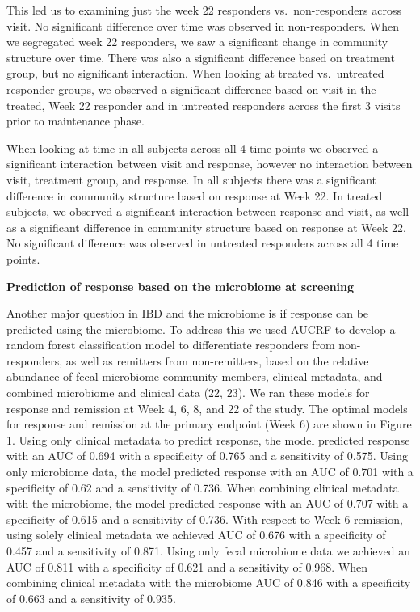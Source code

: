\documentclass[11pt,]{article}
\begin{document}
This led us to examining just the week 22 responders vs.~non-responders
across visit. No significant difference over time was observed in
non-responders. When we segregated week 22 responders, we saw a
significant change in community structure over time. There was also a
significant difference based on treatment group, but no significant
interaction. When looking at treated vs.~untreated responder groups, we
observed a significant difference based on visit in the treated, Week 22
responder and in untreated responders across the first 3 visits prior to
maintenance phase.

When looking at time in all subjects across all 4 time points we
observed a significant interaction between visit and response, however
no interaction between visit, treatment group, and response. In all
subjects there was a significant difference in community structure based
on response at Week 22. In treated subjects, we observed a significant
interaction between response and visit, as well as a significant
difference in community structure based on response at Week 22. No
significant difference was observed in untreated responders across all 4
time points.

\textbf{Prediction of response based on the microbiome at screening}

Another major question in IBD and the microbiome is if response can be
predicted using the microbiome. To address this we used AUCRF to develop
a random forest classification model to differentiate responders from
non-responders, as well as remitters from non-remitters, based on the
relative abundance of fecal microbiome community members, clinical
metadata, and combined microbiome and clinical data (22, 23). We ran
these models for response and remission at Week 4, 6, 8, and 22 of the
study. The optimal models for response and remission at the primary
endpoint (Week 6) are shown in Figure 1. Using only clinical metadata to
predict response, the model predicted response with an AUC of 0.694 with
a specificity of 0.765 and a sensitivity of 0.575. Using only microbiome
data, the model predicted response with an AUC of 0.701 with a
specificity of 0.62 and a sensitivity of 0.736. When combining clinical
metadata with the microbiome, the model predicted response with an AUC
of 0.707 with a specificity of 0.615 and a sensitivity of 0.736. With
respect to Week 6 remission, using solely clinical metadata we achieved
AUC of 0.676 with a specificity of 0.457 and a sensitivity of 0.871.
Using only fecal microbiome data we achieved an AUC of 0.811 with a
specificity of 0.621 and a sensitivity of 0.968. When combining clinical
metadata with the microbiome AUC of 0.846 with a specificity of 0.663
and a sensitivity of 0.935.
\end{document}
